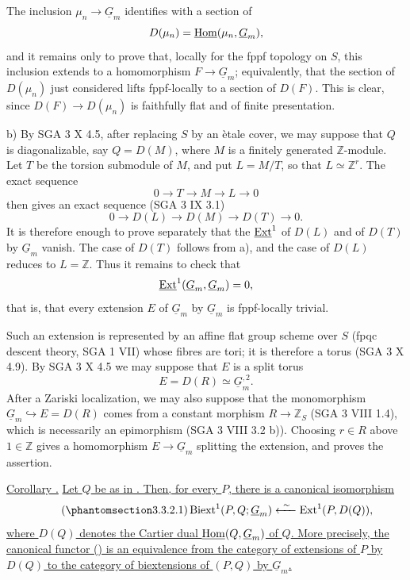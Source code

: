 The inclusion $\mu_n\longrightarrow\underline G_m$ identifies with a
section of
\[
 D(\mu_n)=\uHom(\mu_n,\underline G_m),
\]
and it remains only to prove that, locally for the fppf topology on
$S$, this inclusion extends to a homomorphism
$F\longrightarrow\underline G_m$; equivalently, that the section of
$D(\mu_n)$ just considered lifts fppf-locally to a section of $D(F)$.
This is clear, since $D(F)\longrightarrow D(\mu_n)$ is faithfully flat
and of finite presentation.

\medskip
\noindent b) By SGA 3 X 4.5, after replacing $S$ by an \`etale cover,
we may suppose that $Q$ is diagonalizable, say $Q=D(M)$, where $M$ is
a finitely generated $\mathbb Z$-module.  Let $T$ be the torsion
submodule of $M$, and put $L=M/T$, so that $L\simeq\mathbb Z^r$.  The
exact sequence
\[
 0\longrightarrow T\longrightarrow M\longrightarrow L
 \longrightarrow0
\]
then gives an exact sequence (SGA 3 IX 3.1)
\[
 0\longrightarrow D(L)\longrightarrow D(M)\longrightarrow D(T)
 \longrightarrow0.
\]
It is therefore enough to prove separately that the $\uExt^1$ of
$D(L)$ and of $D(T)$ by $\underline G_m$ vanish.  The case of $D(T)$
follows from a), and the case of $D(L)$ reduces to $L=\mathbb Z$.
Thus it remains to check that
\[
 \uExt^1(\underline G_m,\underline G_m)=0,
\]
that is, that every extension $E$ of $\underline G_m$ by
$\underline G_m$ is fppf-locally trivial.

Such an extension is represented by an affine flat group scheme over
$S$ (fpqc descent theory, SGA 1 VII) whose fibres are tori; it is
therefore a torus (SGA 3 X 4.9).  By SGA 3 X 4.5 we may suppose that
$E$ is a split torus
\[
 E=D(R)\simeq\underline G_m^{,2}.
\]
After a Zariski localization, we may also suppose that the
monomorphism $\underline G_m\hookrightarrow E=D(R)$ comes from a
constant morphism $R\longrightarrow\mathbb Z_S$ (SGA 3 VIII 1.4),
which is necessarily an epimorphism (SGA 3 VIII 3.2 b)).  Choosing
$r\in R$ above $1\in\mathbb Z$ gives a homomorphism
$E\longrightarrow\underline G_m$ splitting the extension, and proves
the assertion.

\medskip
\noindent\underline{Corollary .}  \underline{Let $Q$ be as in
.  Then, for every $P$, there is a canonical isomorphism}
\begin{equation}\tag{\SGARefTarget{sga7.sga7i.eviii.n3-3-2-1}{3.3.2.1}}
 \Biext^1(P,Q;\underline G_m)
 \xleftarrow{\ \sim\ }\Ext^1(P,D(Q)),
\end{equation}
\underline{where $D(Q)$ denotes the Cartier dual
$\uHom(Q,\underline G_m)$ of $Q$.  More precisely, the canonical
functor () is an equivalence from the category of extensions of
$P$ by $D(Q)$ to the category of biextensions of $(P,Q)$ by
$\underline G_m$.}

